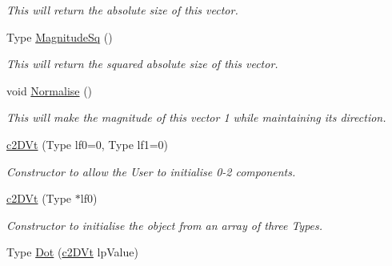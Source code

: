 \begin{DoxyCompactItemize}
\begin{DoxyCompactList}\small\item\em This will return the absolute size of this vector. \end{DoxyCompactList}\item 
\hypertarget{classc2_d_vt_a80f9f2b059f82baa93a50d2d24043580}{
Type \hyperlink{classc2_d_vt_a80f9f2b059f82baa93a50d2d24043580}{MagnitudeSq} ()}
\label{classc2_d_vt_a80f9f2b059f82baa93a50d2d24043580}

\begin{DoxyCompactList}\small\item\em This will return the squared absolute size of this vector. \end{DoxyCompactList}\item 
\hypertarget{classc2_d_vt_ad1a5e0e3588203dffb08794486360990}{
void \hyperlink{classc2_d_vt_ad1a5e0e3588203dffb08794486360990}{Normalise} ()}
\label{classc2_d_vt_ad1a5e0e3588203dffb08794486360990}

\begin{DoxyCompactList}\small\item\em This will make the magnitude of this vector 1 while maintaining its direction. \end{DoxyCompactList}\item 
\hypertarget{classc2_d_vt_ac9e9e1534b873b6bba6ba6213352ce2d}{
\hyperlink{classc2_d_vt_ac9e9e1534b873b6bba6ba6213352ce2d}{c2DVt} (Type lf0=0, Type lf1=0)}
\label{classc2_d_vt_ac9e9e1534b873b6bba6ba6213352ce2d}

\begin{DoxyCompactList}\small\item\em Constructor to allow the User to initialise 0-\/2 components. \end{DoxyCompactList}\item 
\hypertarget{classc2_d_vt_ac7b20158f6541b798fdec915326ca21e}{
\hyperlink{classc2_d_vt_ac7b20158f6541b798fdec915326ca21e}{c2DVt} (Type $\ast$lf0)}
\label{classc2_d_vt_ac7b20158f6541b798fdec915326ca21e}

\begin{DoxyCompactList}\small\item\em Constructor to initialise the object from an array of three Types. \end{DoxyCompactList}\item 
\hypertarget{classc2_d_vt_a29c57b9978f0290a0ee7d9c09fa7cd10}{
Type \hyperlink{classc2_d_vt_a29c57b9978f0290a0ee7d9c09fa7cd10}{Dot} (\hyperlink{classc2_d_vt}{c2DVt} lpValue)}
\label{classc2_d_vt_a29c57b9978f0290a0ee7d9c09fa7cd10}


\end{DoxyCompactItemize}
